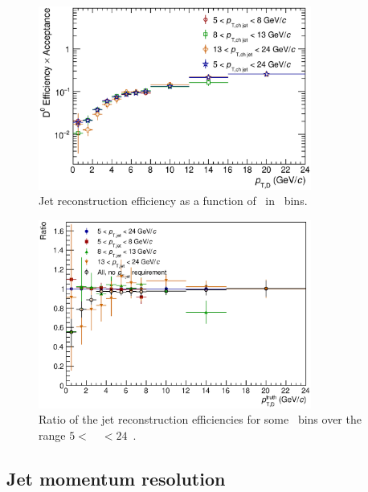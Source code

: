 \begin{figure}[tbh]
\begin{center}
\includegraphics[width=0.8\textwidth]{img/HQ16_Simulation_EfficiencyVsDPt_LogScale}
 \caption{Jet reconstruction efficiency as a function of \ptd\ in \ptchjet\ bins.} 
 \label{fig:HQ16_Simulation_EfficiencyVsDPt_LogScale}
\end{center}
\end{figure}

\begin{figure}[tbh]
\begin{center}
\includegraphics[width=0.8\textwidth]{img/D0_Jet_AKTChargedR040_pt_scheme_D_Spectra_PartialEfficiencyRatios}
 \caption{Ratio of the jet reconstruction efficiencies for some \ptchjet\ bins over the range $5<$~\ptchjet~$<24$~\GeVc.} 
 \label{fig:D0_Jet_AKTChargedR040_pt_scheme_D_Spectra_PartialEfficiencyRatios}
\end{center}
\end{figure}

\subsection{Jet momentum resolution}

